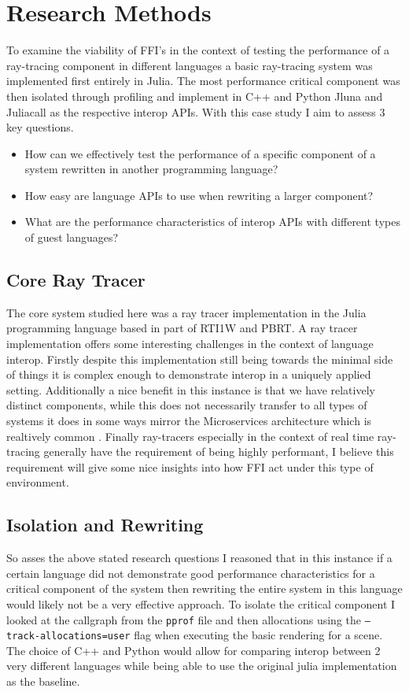 \section{Research Methods}\label{s:method}

To examine the viability of FFI's in the context of testing the performance of a ray-tracing component in different languages a basic ray-tracing system was implemented first entirely in Julia. The most performance critical component was then isolated through profiling and implement in C++ and Python Jluna and Juliacall as the respective interop APIs. With this case study I aim to assess 3 key questions.
\begin{itemize}
    \item How can we effectively test the performance of a specific component of a system rewritten in another programming language?
    \item How easy are language APIs to use when rewriting a larger component?
    \item What are the performance characteristics of interop APIs with different types of guest languages? 
\end{itemize}

\subsection{Core Ray Tracer}
The core system studied here was a ray tracer implementation in the Julia programming language based in part of RTI1W and PBRT. A ray tracer implementation offers some interesting challenges in the context of language interop. Firstly despite this implementation still being towards the minimal side of things it is complex enough to demonstrate interop in a uniquely applied setting. Additionally a nice benefit in this instance is that we have relatively distinct components, while this does not necessarily transfer to all types of systems it does in some ways mirror the Microservices architecture which is realtively common 
.
Finally ray-tracers especially in the context of real time ray-tracing generally have the requirement of being highly performant, I believe this requirement will give some nice insights into how FFI act under this type of environment.

\subsection{Isolation and Rewriting}
So asses the above stated research questions I reasoned that in this instance if a certain language did not demonstrate good performance characteristics for a critical component of the system then rewriting the entire system in this language would likely not be a very effective approach. To isolate the critical component I looked at the callgraph from the \texttt{pprof} file and then allocations using the \texttt{--track-allocations=user} flag when executing the basic rendering for a scene. The choice of C++ and Python would allow for comparing interop between 2 very different languages while being able to use the original julia implementation as the baseline.

